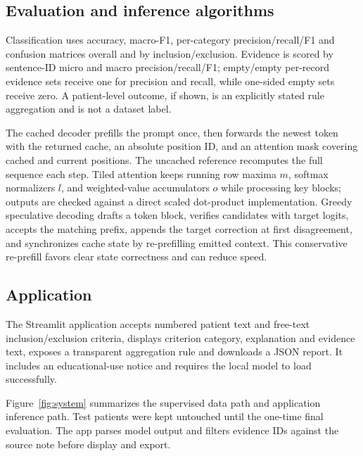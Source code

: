 \documentclass[conference]{IEEEtran}
\begin{document}
\subsection{Evaluation and inference algorithms}
Classification uses accuracy, macro-F1, per-category precision/recall/F1 and confusion matrices overall and by inclusion/exclusion. Evidence is scored by sentence-ID micro and macro precision/recall/F1; empty/empty per-record evidence sets receive one for precision and recall, while one-sided empty sets receive zero. A patient-level outcome, if shown, is an explicitly stated rule aggregation and is not a dataset label.

The cached decoder prefills the prompt once, then forwards the newest token with the returned cache, an absolute position ID, and an attention mask covering cached and current positions. The uncached reference recomputes the full sequence each step. Tiled attention keeps running row maxima $m$, softmax normalizers $l$, and weighted-value accumulators $o$ while processing key blocks; outputs are checked against a direct scaled dot-product implementation. Greedy speculative decoding drafts a token block, verifies candidates with target logits, accepts the matching prefix, appends the target correction at first disagreement, and synchronizes cache state by re-prefilling emitted context. This conservative re-prefill favors clear state correctness and can reduce speed.

\subsection{Application}
The Streamlit application accepts numbered patient text and free-text inclusion/exclusion criteria, displays criterion category, explanation and evidence text, exposes a transparent aggregation rule and downloads a JSON report. It includes an educational-use notice and requires the local model to load successfully.

Figure~\ref{fig:system} summarizes the supervised data path and application inference path. Test patients were kept untouched until the one-time final evaluation. The app parses model output and filters evidence IDs against the source note before display and export.
\end{document}
